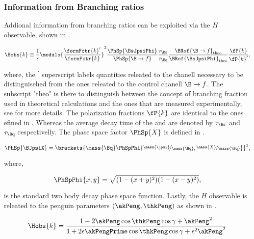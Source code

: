 \subsubsection{Information from Branching ratios}
Addional information from branching ratios can be exploited via the $H$ observable, shown in .

\begin{equation}
\centering
  \Hobs{k} \equiv   \frac{1}{\epsilon}
            \modulo{\frac{\formFctr{k}'}{\formFctr{k}}}^2
                    \frac{\PhSp{\BsJpsiPhi}} {\PhSp{\B\to f}}
                    \frac{\tau_{\Bs}}{\tau_{\Bq}}
                    \frac{\BRof{\B\to f}_{\rm theo}}{\BRof{\BsJpsiPhi}_{\rm theo}}
                    \frac{\fP{k}}{{\fP{k}'}},
\label{bsjpsikst_Hobs_def}
\end{equation}

\noindent where, the ${}^\prime$ superscript labels quantities releated to the \BsJpsiPhi chanell necessary to be
distinguisehed from the ones releated to the control chanell $\B\to f$. The subscript "theo" is there to distinguish
between the concept of branching fraction used in theoretical calculations and the ones that are measured experimentally,
see  for more details. The polarization fractions $\fP{k}$ are identical to the ones
efined in . Whereas the average decay time of the \Bs and \Bq are denoted by $\tau_{\Bs}$ and $\tau_{\Bq}$
respectivelly. The phase space factor $\PhSp{X}$ is defined in .

\begin{equation}
\centering
   \PhSp{\BJpsiX}  = \brackets{ \mass{\Bq} \PhSpPhi{ \nicefrac{\mass{\jpsi}}{\mass{\Bq}}, \nicefrac{\mass{X}}{\mass{\Bq}}  } }^3,
\label{phase_space_eq_def}
\end{equation}

\noindent where,

\begin{equation}
\centering
   \PhSpPhi{x,y} = \sqrt{ (1-(x+y)^2)(1-(x-y)^2) },
\label{phase_space_phi_eq_def}
\end{equation}

\noindent is the standard two body decay phase space function. Lastly, the $H$ observable is releated to the penguin parameters
$(\akPeng,\thkPeng)$ as shown in .

\begin{equation}
\centering
  \Hobs{k} = \frac{1-2\akPeng\cos\thkPeng\cos\gamma + \akPeng^2}{1+2\epsilon\akPengPrime\cos\thkPeng\cos\gamma + \epsilon^2\akPeng^2}
\label{Hobs_peng_param}
\end{equation}

